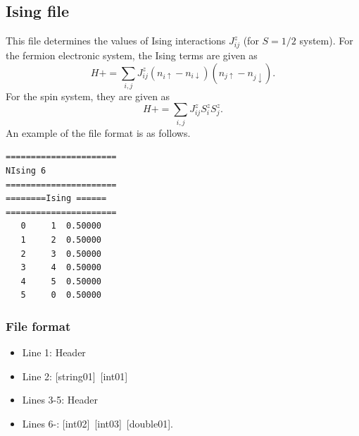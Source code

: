 \subsection{Ising file}
This file determines the values of Ising interactions $J_{ij}^{z}$ {(for $S=1/2$ system)}.
For the fermion electronic system, the Ising terms are given as
\begin{equation}
H+=\sum_{i,j}J_{ij}^{z} (n_{i\uparrow}-n_{i\downarrow})(n_{j\uparrow}-n_{j\downarrow} ).
\end{equation}
For the spin system, they are given as
\begin{equation}
H+=\sum_{i,j}J_{ij}^{z} S_ {i}^{z}S_{j}^z.
\end{equation}
An example of the file format is as follows.

\begin{minipage}{12.5cm}
\begin{screen}
\begin{verbatim}
====================== 
NIsing 6  
====================== 
========Ising ====== 
====================== 
   0     1  0.50000
   1     2  0.50000
   2     3  0.50000
   3     4  0.50000
   4     5  0.50000
   5     0  0.50000
\end{verbatim}
\end{screen}
\end{minipage}

\subsubsection{File format}
 \begin{itemize}
   \item  Line 1:  Header
   \item  Line 2:   [string01]~[int01]
   \item  Lines 3-5:  Header
   \item  Lines 6-: 
   [int02]~[int03]~[double01].
  \end{itemize}
